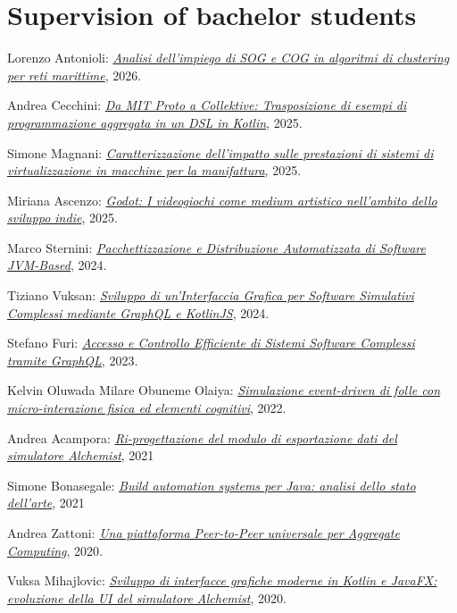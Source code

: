 \section{Supervision of bachelor students}
\vspace{-1em}
\begin{innerlist}
    \item Lorenzo Antonioli: \href{https://amslaurea.unibo.it/39349/}{\textit{Analisi dell'impiego di SOG e COG in algoritmi di clustering per reti marittime}}, 2026.
    \item Andrea Cecchini: \href{https://amslaurea.unibo.it/37130/}{\textit{Da MIT Proto a Collektive: Trasposizione di esempi di programmazione aggregata in un DSL in Kotlin}}, 2025.
    \item Simone Magnani: \href{https://amslaurea.unibo.it/36195/}{\textit{Caratterizzazione dell'impatto sulle prestazioni di sistemi di virtualizzazione in macchine per la manifattura}}, 2025.
    \item Miriana Ascenzo: \href{https://amslaurea.unibo.it/34508/}{\textit{Godot: I videogiochi come medium artistico nell'ambito dello sviluppo indie}}, 2025.
    \item Marco Sternini: \href{http://amslaurea.unibo.it/31694/}{\textit{Pacchettizzazione e Distribuzione Automatizzata di Software JVM-Based}}, 2024.
    \item Tiziano Vuksan: \href{http://amslaurea.unibo.it/31688/}{\textit{Sviluppo di un'Interfaccia Grafica per Software Simulativi Complessi mediante GraphQL e KotlinJS}}, 2024.
    \item Stefano Furi: \href{http://amslaurea.unibo.it/30280/}{\textit{Accesso e Controllo Efficiente di Sistemi Software Complessi tramite GraphQL}}, 2023.
    \item Kelvin Oluwada Milare Obuneme Olaiya: \href{http://amslaurea.unibo.it/26455/}{\textit{Simulazione event-driven di folle con micro-interazione fisica ed elementi cognitivi}}, 2022.
    \item Andrea Acampora: \href{https://amslaurea.unibo.it/24704/}{\textit{Ri-progettazione del modulo di esportazione dati del simulatore Alchemist}}, 2021
    \item Simone Bonasegale: \href{https://amslaurea.unibo.it/23316/}{\textit{Build automation systems per Java: analisi dello stato dell'arte}}, 2021
    \item Andrea Zattoni: \href{https://archive.ph/CnUXg}{\textit{Una piattaforma Peer-to-Peer universale per Aggregate Computing}}, 2020.
    \item Vuksa Mihajlovic: \href{http://amslaurea.unibo.it/21648/}{\textit{Sviluppo di interfacce grafiche moderne in Kotlin e JavaFX: evoluzione della UI del simulatore Alchemist}}, 2020.

\end{innerlist}
